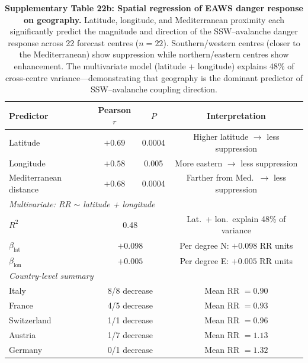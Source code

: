 \begin{table}[!ht]
\centering
\caption{\textbf{Supplementary Table 22b: Spatial regression of EAWS danger response on geography.}
Latitude, longitude, and Mediterranean proximity each significantly predict the magnitude and direction of the SSW--avalanche danger response across 22 forecast centres ($n = 22$). Southern/western centres (closer to the Mediterranean) show suppression while northern/eastern centres show enhancement. The multivariate model (latitude + longitude) explains 48\% of cross-centre variance---demonstrating that geography is the dominant predictor of SSW--avalanche coupling direction.}
\label{tab:eaws_spatial}
\small
\begin{tabular}{lccc}
\toprule
Predictor & Pearson $r$ & $P$ & Interpretation \\
\midrule
Latitude & $+0.69$ & 0.0004 & Higher latitude $\to$ less suppression \\
Longitude & $+0.58$ & 0.005 & More eastern $\to$ less suppression \\
Mediterranean distance & $+0.68$ & 0.0004 & Farther from Med.\ $\to$ less suppression \\
\midrule
\multicolumn{4}{l}{\textit{Multivariate: RR $\sim$ latitude + longitude}} \\
$R^2$ & \multicolumn{2}{c}{0.48} & Lat.\ + lon.\ explain 48\% of variance \\
$\beta_{\mathrm{lat}}$ & \multicolumn{2}{c}{$+0.098$} & Per degree N: $+0.098$ RR units \\
$\beta_{\mathrm{lon}}$ & \multicolumn{2}{c}{$+0.005$} & Per degree E: $+0.005$ RR units \\
\midrule
\multicolumn{4}{l}{\textit{Country-level summary}} \\
Italy & \multicolumn{2}{c}{8/8 decrease} & Mean RR $= 0.90$ \\
France & \multicolumn{2}{c}{4/5 decrease} & Mean RR $= 0.93$ \\
Switzerland & \multicolumn{2}{c}{1/1 decrease} & Mean RR $= 0.96$ \\
Austria & \multicolumn{2}{c}{1/7 decrease} & Mean RR $= 1.13$ \\
Germany & \multicolumn{2}{c}{0/1 decrease} & Mean RR $= 1.32$ \\
\bottomrule
\end{tabular}
\end{table}

